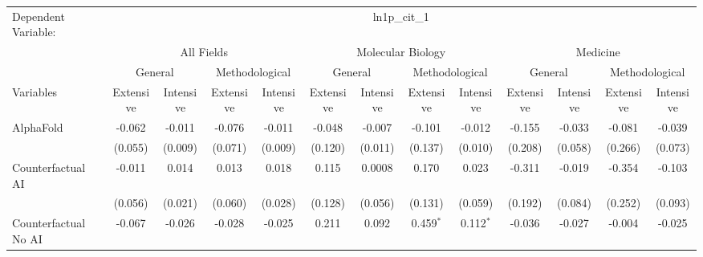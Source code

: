 \begingroup
\centering
\begin{tabular}{lcccccccccccc}
   \tabularnewline \midrule \midrule
   Dependent Variable: & \multicolumn{12}{c}{ln1p\_cit\_1}\\
 & \multicolumn{4}{c}{All Fields} & \multicolumn{4}{c}{Molecular Biology} & \multicolumn{4}{c}{Medicine} \\
\cmidrule(lr){2-5} \cmidrule(lr){6-9} \cmidrule(lr){10-13}
 & \multicolumn{2}{c}{General} & \multicolumn{2}{c}{Methodological} & \multicolumn{2}{c}{General} & \multicolumn{2}{c}{Methodological} & \multicolumn{2}{c}{General} & \multicolumn{2}{c}{Methodological} \\
\cmidrule(lr){2-3} \cmidrule(lr){4-5} \cmidrule(lr){6-7} \cmidrule(lr){8-9} \cmidrule(lr){10-11} \cmidrule(lr){12-13}
Variables & \multicolumn{1}{c}{Extensive} & \multicolumn{1}{c}{Intensive} & \multicolumn{1}{c}{Extensive} & \multicolumn{1}{c}{Intensive} & \multicolumn{1}{c}{Extensive} & \multicolumn{1}{c}{Intensive} & \multicolumn{1}{c}{Extensive} & \multicolumn{1}{c}{Intensive} & \multicolumn{1}{c}{Extensive} & \multicolumn{1}{c}{Intensive} & \multicolumn{1}{c}{Extensive} & \multicolumn{1}{c}{Intensive} \\
\cmidrule(lr){1-1}\cmidrule(lr){2-2} \cmidrule(lr){3-3} \cmidrule(lr){4-4} \cmidrule(lr){5-5} \cmidrule(lr){6-6} \cmidrule(lr){7-7} \cmidrule(lr){8-8} \cmidrule(lr){9-9} \cmidrule(lr){10-10} \cmidrule(lr){11-11} \cmidrule(lr){12-12} \cmidrule(lr){13-13}
   AlphaFold                                & -0.062  & -0.011  & -0.076  & -0.011  & -0.048  & -0.007  & -0.101      & -0.012      & -0.155  & -0.033        & -0.081  & -0.039\\   
                                            & (0.055) & (0.009) & (0.071) & (0.009) & (0.120) & (0.011) & (0.137)     & (0.010)     & (0.208) & (0.058)       & (0.266) & (0.073)\\   
   Counterfactual AI                        & -0.011  & 0.014   & 0.013   & 0.018   & 0.115   & 0.0008  & 0.170       & 0.023       & -0.311  & -0.019        & -0.354  & -0.103\\   
                                            & (0.056) & (0.021) & (0.060) & (0.028) & (0.128) & (0.056) & (0.131)     & (0.059)     & (0.192) & (0.084)       & (0.252) & (0.093)\\   
   Counterfactual No AI                     & -0.067  & -0.026  & -0.028  & -0.025  & 0.211   & 0.092   & 0.459$^{*}$ & 0.112$^{*}$ & -0.036  & -0.027        & -0.004  & -0.025\\   

\end{tabular}

